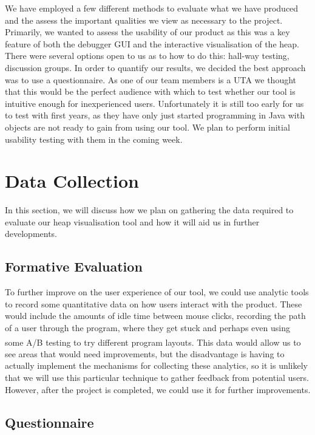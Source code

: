 \documentclass[10pt, a4paper]{article}
\begin{document}
We have employed a few different methods to evaluate what we have produced and the assess the important qualities we view as necessary to the project. Primarily, we wanted to assess the usability of our product as this was a key feature of both the debugger GUI and the interactive visualisation of the heap. There were several options open to us as to how to do this: hall-way testing, discussion groups. In order to quantify our results, we decided the best approach was to use a questionnaire. As one of our team members is a UTA we thought that this would be the perfect audience with which to test whether our tool is intuitive enough for inexperienced users. Unfortunately it is still too early for us to test with first years, as they have only just started programming in Java with objects are not ready to gain from using our tool. We plan to perform initial usability testing with them in the coming week.


\section{Data Collection}
In this section, we will discuss how we plan on gathering the data required to evaluate our heap visualisation tool and how it will aid us in further developments.

\subsection{Formative Evaluation}
To further improve on the user experience of our tool, we could use analytic tools to record some quantitative data on how users interact with the product. These would include the amounts of idle time between mouse clicks, recording the path of a user through the program, where they get stuck and perhaps even using some A/B testing to try different program layouts\textsuperscript{\cite{opt}}. This data would allow us to see areas that would need improvements, but the disadvantage is having to actually implement the mechanisms for collecting these analytics, so it is unlikely that we will use this particular technique to gather feedback from potential users. However, after the project is completed, we could use it for further improvements. 

\subsection{Questionnaire}
\end{document}

